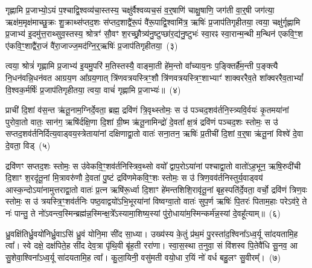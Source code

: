 गृह्णामि प्र॒जाभ्यो॒\-ऽयं प॒श्चाद्वि॒श्वव्य॑चा॒स्तस्य॒ चक्षु॑र्वैश्वव्यच॒सं व॒र्॒\mbox{}षाणि॑ चाक्षु॒षाणि॒ जग॑ती वा॒र्॒\mbox{}षी जग॑त्या॒ ऋक्ष॑म॒मृक्ष॑माच्छु॒क्रः शु॒क्राथ्स॑प्तद॒शः स॑प्तद॒शाद्वै॑रू॒पं वै॑रू॒पाद्वि॒श्वामि॑त्र॒ ऋषिः॑ प्र॒जा\-प॑तिगृहीतया॒ त्वया॒ चक्षु॑र्गृह्णामि प्र॒जाभ्य॑ इ॒दमु॑त्त॒राथ्सुव॒स्तस्य॒ श्रोत्रꣳ॑ सौ॒वꣳ श॒रच्छ्रौ॒त्र्य॑नु॒ष्टुप्छा॑र॒द्य॑नु॒ष्टुभः॑ स्वा॒रꣴ स्वा॒रान्म॒न्थी म॒न्थिन॑ एकवि॒ꣳ॒श ए॑कवि॒ꣳ॒शाद्वै॑रा॒जं वै॑रा॒जाज्ज॒मद॑ग्नि॒र्॒\mbox{}ऋषिः॑ प्र॒जा\-प॑तिगृहीतया॒~(३)\ip

त्वया॒ श्रोत्रं॑ गृह्णामि प्र॒जाभ्य॑ इ॒यमु॒परि॑ म॒तिस्तस्यै॒ वाङ्मा॒ती हे॑म॒न्तो वा᳚च्याय॒नः प॒ङ्क्तिर्\mbox{}है॑म॒न्ती प॒ङ्क्त्यै नि॒धन॑वन्नि॒धन॑वत आग्रय॒ण आ᳚ग्रय॒णात् त्रि॑णवत्रयस्त्रिꣳ॒शौ त्रि॑णवत्रयस्त्रिꣳ॒शाभ्याꣳ॑ शाक्वररैव॒ते शा᳚क्वररैव॒ता\-भ्यां᳚ वि॒श्वक॒र्मर्\mbox{}षिः॑ प्र॒जा\-प॑तिगृहीतया॒ त्वया॒ वाचं॑ गृह्णामि प्र॒जाभ्यः॑॥~(४)\ip

{\anuvakamend[{त्वया॒ मनो॑ ज॒मद॑ग्नि॒र्॒\mbox{}ऋषिः॑ प्र॒जा\-प॑तिगृहीतया त्रि॒ꣳ॒शच्च॑}]}

प्राची॑ दि॒शां व॑स॒न्त ऋ॑तू॒नाम॒ग्निर्दे॒वता॒ ब्रह्म॒ द्रवि॑णं त्रि॒वृथ्स्तोमः॒ स उ॑ पञ्चद॒शव॑र्तनि॒स्त्र्यवि॒र्वयः॑ कृ॒तमया॑नां पुरोवा॒तो वातः॒ सान॑ग॒ ऋषि॑र्दक्षि॒णा दि॒शां ग्री॒ष्म ऋ॑तू॒नामिन्द्रो॑ दे॒वता᳚ क्ष॒त्रं द्रवि॑णं पञ्चद॒शः स्तोमः॒ स उ॑ सप्तद॒शव॑र्तनिर्दित्य॒वाड्वय॒स्त्रेताया॑नां दक्षिणाद्वा॒तो वातः॑ सना॒तन॒ ऋषिः॑ प्र॒तीची॑ दि॒शां व॒र्॒\mbox{}षा ऋ॑तू॒नां विश्वे॑ दे॒वा दे॒वता॒ विड्~(५)\ip

द्रवि॑णꣳ सप्तद॒शः स्तोमः॒ स उ॑वेकवि॒ꣳ॒शव॑र्तनिस्त्रिव॒थ्सो वयो᳚ द्वाप॒रो\-ऽया॑नां पश्चाद्वा॒तो वातो॑\-ऽह॒भून॒ ऋषि॒रुदी॑ची दि॒शाꣳ श॒रदृ॑तू॒नां मि॒त्रावरु॑णौ दे॒वता॑ पु॒ष्टं द्रवि॑णमेकवि॒ꣳ॒शः स्तोमः॒ स उ॑ त्रिण॒वव॑र्तनिस्तुर्य॒वाड्वय॑ आस्क॒न्दो\-ऽया॑नामुत्तराद्वा॒तो वातः॑ प्र॒त्न ऋषि॑रू॒र्ध्वा दि॒शाꣳ हे॑मन्तशिशि॒रावृ॑तू॒नां बृह॒स्पति॑र्दे॒वता॒ वर्चो॒ द्रवि॑णं त्रिण॒वः स्तोमः॒ स उ॑ त्रयस्त्रि॒ꣳ॒शव॑र्तनिः पष्ठ॒वाद्वयो॑\-ऽभि॒भूरया॑नां विष्वग्वा॒तो वातः॑ सुप॒र्ण ऋषिः॑ पि॒तरः॑ पिताम॒हाः परे\-ऽव॑रे॒ ते नः॑ पान्तु॒ ते नो॑\-ऽवन्त्व॒स्मिन्ब्रह्म॑न्न॒स्मिन्क्ष॒त्रे᳚\-ऽस्यामा॒शिष्य॒स्यां पु॑रो॒धाया॑म॒स्मिन्कर्म॑न्न॒स्यां दे॒वहू᳚त्याम्॥~(६)\ip

{\anuvakamend[{विट्प॑ष्ठ॒वाड्वयो॒\-ऽष्टाविꣳ॑शतिश्च}]}

ध्रु॒वक्षि॑तिर्ध्रु॒वयो॑निर्ध्रु॒वाऽसि॑ ध्रु॒वं योनि॒मा सी॑द सा॒ध्या। उख्य॑स्य के॒तुं प्र॑थ॒मं पु॒रस्ता॑द॒श्विना᳚\-ऽ\-ध्व॒र्यू सा॑दयतामि॒ह त्वा᳚। स्वे दक्षे॒ दक्ष॑पिते॒ह सी॑द देव॒त्रा पृ॑थि॒वी बृ॑ह॒ती ररा॑णा। स्वा॒स॒स्था त॒नुवा॒ सं वि॑शस्व पि॒तेवै॑धि सू॒नव॒ आ सु॒शेवा॒श्विना᳚\-ऽ\-ध्व॒र्यू सा॑दयतामि॒ह त्वा᳚। कु॒ला॒यिनी॒ वसु॑मती वयो॒धा र॒यिं नो॑ वर्ध बहु॒लꣳ सु॒वीरम्᳚।~(७)\ip

